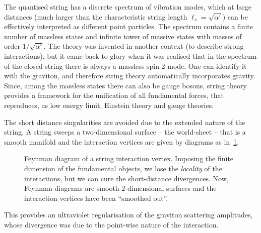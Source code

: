 \documentclass[draft]{phd}
\begin{document}
The quantised string has a discrete spectrum of vibration modes, which at large distances (much larger than the characteristic string length $\ell_s = \sqrt{\alpha'}$) can be effectively
interpreted as different point particles. 
The spectrum contains a finite number of massless states and infinite tower of massive states with masses of order $1/\sqrt{\alpha'}$.
The theory was invented in another context (to describe strong interactions), but it came back to glory when it was realised that in the spectrum of the closed string there is always a massless spin 2 mode. One can identify it with the graviton, and therefore string theory automatically incorporates gravity. Since, among the massless states there can also be
gauge bosons, string theory provides a framework for the unification of all fundamental forces, that reproduces, as low energy limit, Einstein theory and gauge theories.


		
The short distance singularities are avoided due to the extended nature of the string. A string sweeps a two-dimensional surface -- the world-sheet -- that is a smooth manifold and the interaction vertices are given by diagrams as in~\cref{stringdiagram}.
				\begin{figure}[ht]
					\centering
						\scalebox{1.3}{}
					\caption{Feynman diagram of a string interaction vertex. 
						Imposing the finite dimension of the fundamental objects, we lose the \emph{locality} of the interactions, but we can cure the short-distance divergences.
						Now, Feynman diagrams are smooth $2$-dimensional surfaces and the interaction vertices have been ``smoothed out''.
					 }
					\label{stringdiagram}
				\end{figure}
This provides an ultraviolet regularisation of the graviton scattering amplitudes, whose divergence was due to the point-wise nature of the interaction.
		
\end{document}
